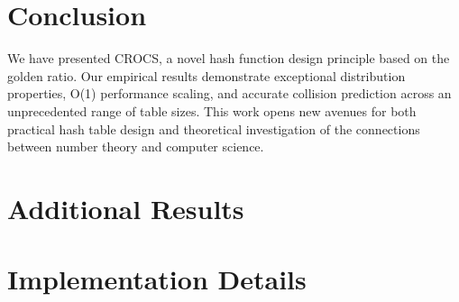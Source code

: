 \documentclass[11pt,a4paper]{article}
\theoremstyle{definition}
\newcommand{\crocs}{\textsc{CROCS}}
\begin{document}
\section{Conclusion}

We have presented \crocs{}, a novel hash function design principle based on the golden ratio. Our empirical results demonstrate exceptional distribution properties, O(1) performance scaling, and accurate collision prediction across an unprecedented range of table sizes. This work opens new avenues for both practical hash table design and theoretical investigation of the connections between number theory and computer science.




\appendix

\section{Additional Results}


\section{Implementation Details}

\end{document}
